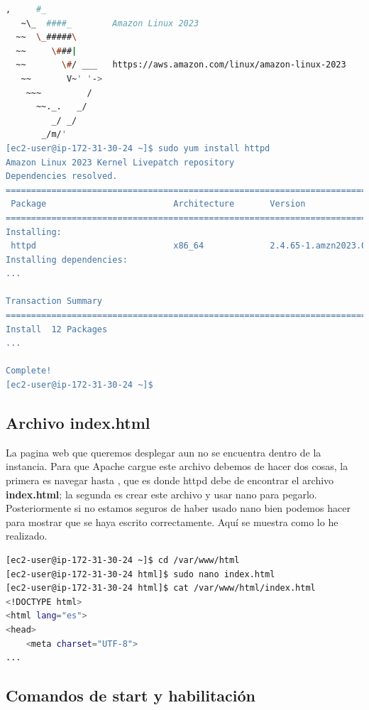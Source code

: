 \documentclass{article}
\begin{document}
\begin{lstlisting}[style=consola, language=bash, caption={Terminal, dependencias}]
   ,     #_
   ~\_  ####_        Amazon Linux 2023
  ~~  \_#####\
  ~~     \###|
  ~~       \#/ ___   https://aws.amazon.com/linux/amazon-linux-2023
   ~~       V~' '->
    ~~~         /
      ~~._.   _/
         _/ _/
       _/m/'
[ec2-user@ip-172-31-30-24 ~]$ sudo yum install httpd
Amazon Linux 2023 Kernel Livepatch repository                                           177 kB/s |  23 kB     00:00
Dependencies resolved.
==================================================================================
 Package                         Architecture       Version                               Repository               Size
==================================================================================
Installing:
 httpd                           x86_64             2.4.65-1.amzn2023.0.1                 amazonlinux              47 k
Installing dependencies:
...

Transaction Summary
==================================================================================
Install  12 Packages
...

Complete!
[ec2-user@ip-172-31-30-24 ~]$

\end{lstlisting}

\subsection{Archivo index.html}

	La pagina web que queremos desplegar aun no se encuentra dentro de la instancia. Para que Apache cargue este archivo debemos de hacer dos cosas, la primera es navegar hasta , que es donde httpd debe de encontrar el archivo \textbf{index.html}; la segunda es crear este archivo y usar nano para pegarlo. Posteriormente si no estamos seguros de haber usado nano bien podemos hacer  para mostrar que se haya escrito correctamente. Aquí se muestra como lo he realizado.


\begin{lstlisting}[style=consola, language=bash, caption={Terminal, index.html}]
[ec2-user@ip-172-31-30-24 ~]$ cd /var/www/html
[ec2-user@ip-172-31-30-24 html]$ sudo nano index.html
[ec2-user@ip-172-31-30-24 html]$ cat /var/www/html/index.html
<!DOCTYPE html>
<html lang="es">
<head>
    <meta charset="UTF-8">
...
\end{lstlisting}
\newpage
\subsection{Comandos de start y habilitación}
\end{document}
